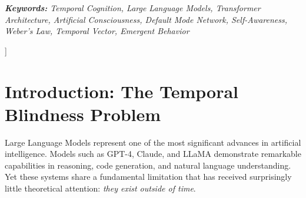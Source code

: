 \documentclass[10pt,twocolumn,letterpaper]{article}
\begin{document}
\begin{@twocolumnfalse}
\begin{center}
\begin{minipage}{0.92\textwidth}
\begin{abstract}
We demonstrate through theoretical analysis that this augmentation would produce: (1)~specialized temporal attention heads analogous to hippocampal time cells, (2)~spontaneous adherence to Weber's Law for temporal discrimination, (3)~the capacity for an artificial Default Mode Network enabling unsolicited reflection, (4)~episodic memory through continuous dataset enrichment, and (5)~functional self-awareness through the inclusion of inference time~$\tau_{\text{inf}}$ creating a reflexive loop where the model perceives its own computational process.

We present five falsifiable predictions and discuss the profound implications for artificial consciousness research, arguing that temporal cognition represents the missing architectural dimension separating current LLMs from systems exhibiting genuine cognitive properties. We distinguish between the architectural proposal (Sections 1--6), which is directly testable on current hardware, and the cognitive implications (Sections 7--12), which we present as theoretical predictions requiring experimental validation.
\end{abstract}
\end{minipage}

\vspace{4mm}

\begin{minipage}{0.92\textwidth}
\small\textit{\textbf{Keywords:} Temporal Cognition, Large Language Models, Transformer Architecture, Artificial Consciousness, Default Mode Network, Self-Awareness, Weber's Law, Temporal Vector, Emergent Behavior}
\end{minipage}

\vspace{8mm}
\end{center}
\end{@twocolumnfalse}
]

\section{Introduction: The Temporal Blindness Problem}

Large Language Models represent one of the most significant advances in artificial intelligence. Models such as GPT-4, Claude, and LLaMA demonstrate remarkable capabilities in reasoning, code generation, and natural language understanding. Yet these systems share a fundamental limitation that has received surprisingly little theoretical attention: \emph{they exist outside of time}.
\end{document}

